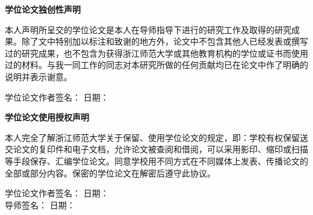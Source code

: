 \documentclass[12pt,a4paper,openright,UTF8]{ctexbook}
\newcommand{\thesisUniversity}{浙江师范大学}
\begin{document}
\newpage
\thispagestyle{empty}
\begin{center}
    {\bfseries 学位论文独创性声明}
\end{center}
\vspace{1cm}
本人声明所呈交的学位论文是本人在导师指导下进行的研究工作及取得的研究成果。除了文中特别加以标注和致谢的地方外，论文中不包含其他人已经发表或撰写过的研究成果，也不包含为获得\thesisUniversity 或其他教育机构的学位或证书而使用过的材料。与我一同工作的同志对本研究所做的任何贡献均已在论文中作了明确的说明并表示谢意。
\vspace{2cm}
\begin{flushright}
    学位论文作者签名：\underline{\hspace{4cm}} \quad 日期：\underline{\hspace{3cm}}
\end{flushright}

\newpage
\thispagestyle{empty}
\begin{center}
    {\bfseries 学位论文使用授权声明}
\end{center}
\vspace{1cm}
本人完全了解\thesisUniversity 关于保留、使用学位论文的规定，即：学校有权保留送交论文的复印件和电子文档，允许论文被查阅和借阅，可以采用影印、缩印或扫描等手段保存、汇编学位论文。同意学校用不同方式在不同媒体上发表、传播论文的全部或部分内容。保密的学位论文在解密后遵守此协议。
\vspace{2cm}
\begin{flushright}
    学位论文作者签名：\underline{\hspace{4cm}} \quad 日期：\underline{\hspace{3cm}} \\[1cm]
    导师签名：\underline{\hspace{4.6cm}} \quad 日期：\underline{\hspace{3cm}}
\end{flushright}

\newpage
{}
\setcounter{page}{1}
\tableofcontents
\newpage
{}
\setcounter{page}{1}














\end{document}
